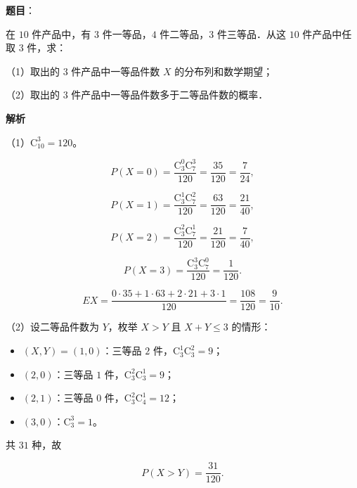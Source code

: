 \begin{answer}

\textbf{题目}：

在 $10$ 件产品中，有 $3$ 件一等品，$4$ 件二等品，$3$ 件三等品．从这 $10$ 件产品中任取 $3$ 件，求：

（1）取出的 $3$ 件产品中一等品件数 $X$ 的分布列和数学期望；

（2）取出的 $3$ 件产品中一等品件数多于二等品件数的概率．

\textbf{解析}

（1）$\mathrm C_{10}^3=120$。

\nopagebreak[4]
\[P(X=0)=\frac{\mathrm C_3^0\mathrm C_7^3}{120}=\frac{35}{120}=\frac7{24},\]

\nopagebreak[4]
\[P(X=1)=\frac{\mathrm C_3^1\mathrm C_7^2}{120}=\frac{63}{120}=\frac{21}{40},\]

\nopagebreak[4]
\[P(X=2)=\frac{\mathrm C_3^2\mathrm C_7^1}{120}=\frac{21}{120}=\frac7{40},\]

\nopagebreak[4]
\[P(X=3)=\frac{\mathrm C_3^3\mathrm C_7^0}{120}=\frac1{120}.\]

\nopagebreak[4]
\[EX=\frac{0\cdot35+1\cdot63+2\cdot21+3\cdot1}{120}
=\frac{108}{120}=\frac9{10} .\]

（2）设二等品件数为 $Y$，枚举 $X>Y$ 且 $X+Y\leqslant3$ 的情形：

\begin{itemize}
\item $(X,Y)=(1,0)$：三等品 $2$ 件，$\mathrm C_3^1\mathrm C_3^2=9$；
\item $(2,0)$：三等品 $1$ 件，$\mathrm C_3^2\mathrm C_3^1=9$；
\item $(2,1)$：三等品 $0$ 件，$\mathrm C_3^2\mathrm C_4^1=12$；
\item $(3,0)$：$\mathrm C_3^3=1$。
\end{itemize}

共 $31$ 种，故

\nopagebreak[4]
\[P(X>Y)=\frac{31}{120} .\]


\end{answer}
